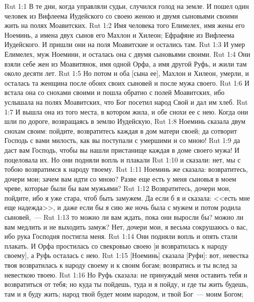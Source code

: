 \vs Rut 1:1 В те дни, когда управляли судьи, случился голод на земле. И пошел один человек из Вифлеема Иудейского со своею женою и двумя сыновьями своими жить на полях Моавитских.
\vs Rut 1:2 Имя человека того Елимелех, имя жены его Ноеминь, а имена двух сынов его Махлон и Хилеон;  Ефрафяне из Вифлеема Иудейского. И пришли они на поля Моавитские и остались там.
\vs Rut 1:3 И умер Елимелех, муж Ноемини, и осталась она с двумя сыновьями своими.
\vs Rut 1:4 Они взяли себе жен из Моавитянок, имя одной Орфа, а имя другой Руфь, и жили там около десяти лет.
\vs Rut 1:5 Но потом и оба [сына ее], Махлон и Хилеон, умерли, и осталась та женщина после обоих своих сыновей и после мужа своего.
\vs Rut 1:6 И встала она со снохами своими и пошла обратно с полей Моавитских, ибо услышала на полях Моавитских, что Бог посетил народ Свой и дал им хлеб.
\vs Rut 1:7 И вышла она из того места, в котором жила, и обе снохи ее с нею. Когда они шли по дороге, возвращаясь в землю Иудейскую,
\vs Rut 1:8 Ноеминь сказала двум снохам своим: пойдите, возвратитесь каждая в дом матери своей; да сотворит Господь с вами милость, как вы поступали с умершими и со мною!
\vs Rut 1:9 да даст вам Господь, чтобы вы нашли пристанище каждая в доме своего мужа! И поцеловала их. Но они подняли вопль и плакали
\vs Rut 1:10 и сказали: нет, мы с тобою возвратимся к народу твоему.
\vs Rut 1:11 Ноеминь же сказала: возвратитесь, дочери мои; зачем вам идти со мною? Разве еще есть у меня сыновья в моем чреве, которые были бы вам мужьями?
\vs Rut 1:12 Возвратитесь, дочери мои, пойдите, ибо я уже стара, чтоб быть замужем. Да если б я и сказала: <<есть мне еще надежда>>, и даже если бы я сию же ночь была с мужем и потом родила сыновей,~---
\vs Rut 1:13 то можно ли вам ждать, пока они выросли бы? можно ли вам медлить и не выходить замуж? Нет, дочери мои, я весьма сокрушаюсь о вас, ибо рука Господня постигла меня.
\vs Rut 1:14 Они подняли вопль и опять стали плакать. И Орфа простилась со свекровью своею [и возвратилась к народу своему], а Руфь осталась с нею.
\vs Rut 1:15 [Ноеминь] сказала [Руфи]: вот, невестка твоя возвратилась к народу своему и к своим богам; возвратись и ты вслед за невесткою твоею.
\vs Rut 1:16 Но Руфь сказала: не принуждай меня оставить тебя и возвратиться от тебя; но куда ты пойдешь, туда и я пойду, и где ты жить будешь, там и я буду жить; народ твой будет моим народом, и твой Бог~--- моим Богом;
